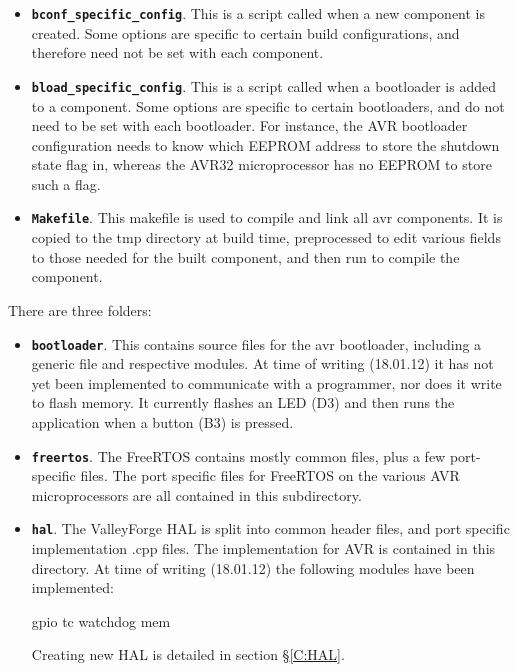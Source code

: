 \documentclass[a4paper, oneside, 11pt, titlepage, onecolumn, openright]{report}
\begin{document}
\begin{itemize}

\item \textbf{\texttt{bconf\_specific\_config}}. This is a script called when a new component is created. Some options are specific to certain build configurations, and therefore need not be set with each component. 

\item \textbf{\texttt{bload\_specific\_config}}. This is a script called when a bootloader is added to a component. Some options are specific to certain bootloaders, and do not need to be set with each bootloader. For instance, the AVR bootloader configuration needs to know which EEPROM address to store the shutdown state flag in, whereas the AVR32 microprocessor has no EEPROM to store such a flag.

\item \textbf{\texttt{Makefile}}. This makefile is used to compile and link all avr components. It is copied to the tmp directory at build time, preprocessed to edit various fields to those needed for the built component, and then run to compile the component.

\end{itemize}					

There are three folders:

\begin{itemize}

\item \textbf{\texttt{bootloader}}. This contains source files for the avr bootloader, including a generic file and respective modules. At time of writing (18.01.12) it has not yet been implemented to communicate with a programmer, nor does it write to flash memory. It currently flashes an LED (D3) and then runs the application when a button (B3) is pressed.

\item \textbf{\texttt{freertos}}. The FreeRTOS contains mostly common files, plus a few port-specific files. The port specific files for FreeRTOS on the various AVR microprocessors are all contained in this subdirectory.

\item \textbf{\texttt{hal}}. The ValleyForge HAL is split into common header files, and port specific implementation .cpp files. The implementation for AVR is contained in this directory. At time of writing (18.01.12) the following modules have been implemented:

gpio
tc
watchdog
mem

Creating new HAL is detailed in section \S\ref{C:HAL}.

\end{itemize}
\end{document}
